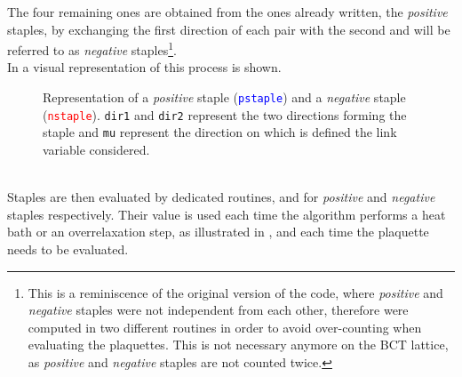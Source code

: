 The four remaining ones are obtained from the ones already written, the \emph{positive} staples, by exchanging the first direction of each pair with the second and will be referred to as \emph{negative} staples\footnote{This is a reminiscence of the original version of the code, where \emph{positive} and \emph{negative} staples were not independent from each other, therefore were computed in two different routines in order to avoid over-counting when evaluating the plaquettes. This is not necessary anymore on the BCT lattice, as \emph{positive} and \emph{negative} staples are not counted twice.}.\\
In  a visual representation of this process is shown.
\begin{figure}[!htbp]
    \centering
    \caption{Representation of a \emph{positive} staple (\textcolor{blue}{\texttt{pstaple}}) and a \emph{negative} staple (\textcolor{red}{\texttt{nstaple}}). \texttt{dir1} and \texttt{dir2} represent the two directions forming the staple and \texttt{mu} represent the direction on which is defined the link variable considered.}
    \label{4F:Staples}
\end{figure}\\
Staples are then evaluated by dedicated routines,  and  for \emph{positive} and \emph{negative} staples respectively.
Their value is used each time the algorithm performs a heat bath or an overrelaxation step, as illustrated in , and each time the plaquette needs to be evaluated.

